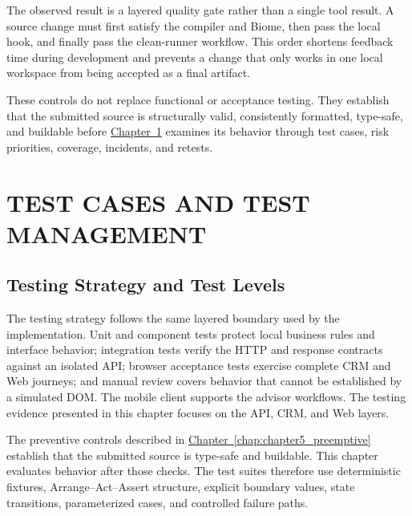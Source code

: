 \documentclass[letterpaper%
, oneside%
, 12pt%
, memoireprojet%
, english%
,creativecommons,hyperref, withAlgo2e %
]{thETS}
\begin{document}
The observed result is a layered quality gate rather than a single tool result. A source change must
first satisfy the compiler and Biome, then pass the local hook, and finally pass the clean-runner
workflow. This order shortens feedback time during development and prevents a change that only
works in one local workspace from being accepted as a final artifact.

These controls do not replace functional or acceptance testing. They establish that the submitted
source is structurally valid, consistently formatted, type-safe, and buildable before
\hyperref[chap:chapter6_tests]{Chapter~\ref*{chap:chapter6_tests}} examines its behavior through
test cases, risk priorities, coverage, incidents, and retests.

\chapter{TEST CASES AND TEST MANAGEMENT}
\label{chap:chapter6_tests}

\section{Testing Strategy and Test Levels}
The testing strategy follows the same layered boundary used by the implementation. Unit and
component tests protect local business rules and interface behavior; integration tests verify the
HTTP and response contracts against an isolated API; browser acceptance tests exercise complete
CRM and Web journeys; and manual review covers behavior that cannot be established by a simulated
DOM. The mobile client supports the advisor workflows. The testing evidence presented in this
chapter focuses on the API, CRM, and Web layers.

The preventive controls described in
\hyperref[chap:chapter5_preemptive]{Chapter~\ref*{chap:chapter5_preemptive}} establish that the
submitted source is type-safe and buildable. This chapter evaluates behavior after those checks.
The test suites therefore use deterministic fixtures, Arrange--Act--Assert structure, explicit
boundary values, state transitions, parameterized cases, and controlled failure paths.
\end{document}
